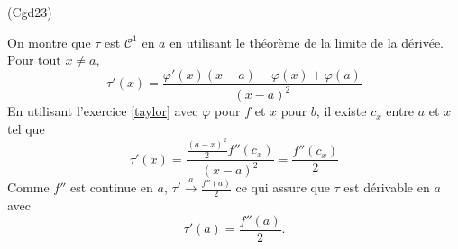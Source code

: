 \begin{tiny}(Cgd23)\end{tiny} On montre que $\tau$ est $\mathcal{C}^1$ en $a$ en utilisant le théorème de la limite de la dérivée.\newline
Pour tout $x\neq a$,
\[
 \tau'(x) =
\frac{\varphi'(x)(x-a)-\varphi(x) + \varphi(a)}{(x-a)^2}
\]
En utilisant l'exercice \ref{taylor} avec $\varphi$ pour $f$ et $x$ pour $b$, il existe $c_x$ entre $a$ et $x$ tel que 
\[
 \tau'(x) = \frac{\frac{(a-x)^2}{2}f''(c_x)}{(x-a)^2}
 = \frac{f''(c_x)}{2}
\]
Comme $f''$ est continue en $a$, $\tau' \xrightarrow{a} \frac{f''(a)}{2}$ ce qui assure que $\tau$ est dérivable en $a$ avec
\[
 \tau'(a) = \frac{f''(a)}{2}.
\]
